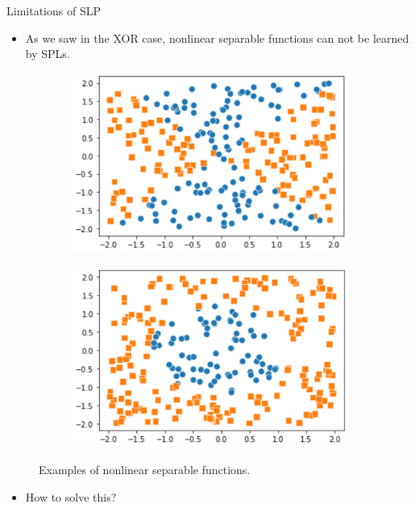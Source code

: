 \begin{frame}{Limitations of SLP}
    \begin{itemize}
        \item As we saw in the XOR case, nonlinear separable functions can not be learned by SPLs.
    \end{itemize}
    \begin{figure}[H]
        \centering
        \begin{subfigure}[b]{0.4\textwidth}
            \centering
            \includegraphics[width=\textwidth]{Figs/non-linear1.png}
        \end{subfigure}
        \hspace*{1.5em}
        \begin{subfigure}[b]{0.4\textwidth}
            \centering
            \includegraphics[width=\textwidth]{Figs/non-linear2.png}
        \end{subfigure}
        \caption{Examples of nonlinear separable functions.}
    \end{figure}    
    \begin{itemize}
        \item How to solve this?
    \end{itemize}
\end{frame}

